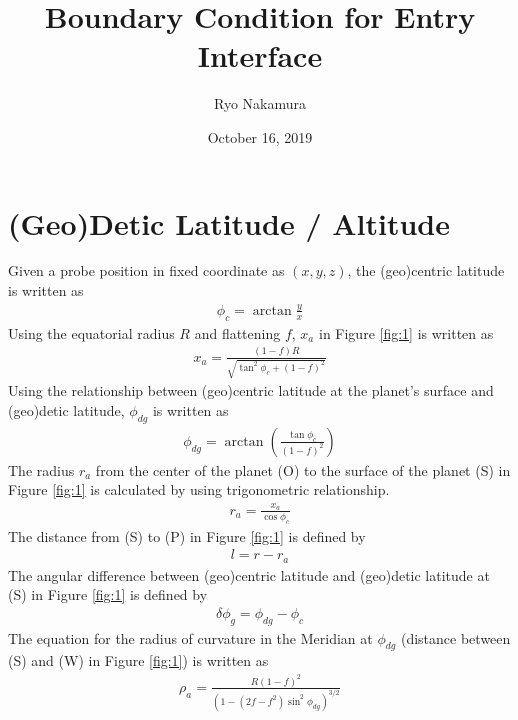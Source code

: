 \documentclass[11pt]{article}
\title{Boundary Condition for Entry Interface}
\author{Ryo Nakamura}
\date{October 16, 2019}
\begin{document}
\maketitle
\section{(Geo)Detic Latitude / Altitude \cite{dalt}\cite{dlat}}
Given a probe position in fixed coordinate as $(x, y, z)$, the (geo)centric latitude is written as
\begin{equation}
	\label{eq:geo_lat}
	\begin{aligned}
		\phi_c = \arctan{\frac{y}{x}}
	\end{aligned}
\end{equation}
Using the equatorial radius $R$ and flattening $f$, $x_a$ in Figure \ref{fig:1} is written as
\begin{equation}
	\label{eq:x_a}
	\begin{aligned}
		x_a = \frac{(1-f)R}{\sqrt{\tan^{2}{\phi_c}+(1-f)^2}}
	\end{aligned}
\end{equation}
Using the relationship between (geo)centric latitude at the planet's surface and (geo)detic latitude, $\phi_{dg}$ is written as
\begin{equation}
	\label{eq:phi_dg}
	\begin{aligned}
		\phi_{dg} =\arctan{\left(\frac{\tan{\phi_c}}{(1-f)^2}\right)}
	\end{aligned}
\end{equation}
The radius $r_a$ from the center of the planet (O) to the surface of the planet (S) in Figure \ref{fig:1} is calculated by using trigonometric relationship.
\begin{equation}
	\label{eq:r_a}
	\begin{aligned}
		r_a = \frac{x_a}{\cos{\phi_c}}
	\end{aligned}
\end{equation}
The distance from (S) to (P) in Figure \ref{fig:1} is defined by
\begin{equation}
	\label{eq:l}
	\begin{aligned}
		l = r - r_a
	\end{aligned}
\end{equation}
The angular difference between (geo)centric latitude and (geo)detic latitude at (S) in Figure \ref{fig:1} is defined by
\begin{equation}
	\label{eq:delta_phi_g}
	\begin{aligned}
	\delta\phi_g = \phi_{dg} - \phi_c
	\end{aligned}
\end{equation}
The equation for the radius of curvature in the Meridian at $\phi_{dg}$ (distance between (S) and (W) in Figure \ref{fig:1}) is written as
\begin{equation}
	\label{eq:rho_a}
	\begin{aligned}
	\rho_a = \frac{R(1-f)^2}{\left(1-(2f-f^2)\sin^2{\phi_{dg}}\right)^{3/2}}
	\end{aligned}
\end{equation}
\end{document}
